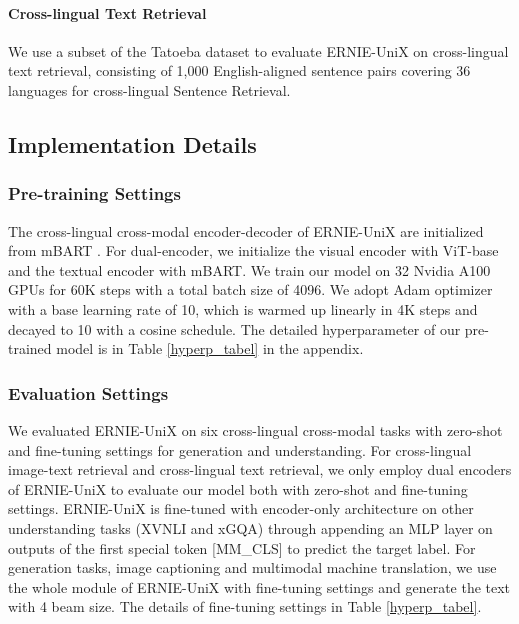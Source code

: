 \documentclass{article}
\begin{document}
\paragraph{Cross-lingual Text Retrieval}
We use a subset of the Tatoeba \cite{tatoeba} dataset to evaluate ERNIE-UniX on cross-lingual text retrieval, consisting of 1,000 English-aligned sentence pairs covering 36 languages for cross-lingual Sentence Retrieval.
\subsection{Implementation Details}
\subsubsection{Pre-training Settings}
The cross-lingual cross-modal encoder-decoder of ERNIE-UniX are initialized from mBART \cite{mbart}. For dual-encoder, we initialize the visual encoder with ViT-base \cite{vit2020} and the textual encoder with mBART. We train our model on 32 Nvidia A100 GPUs for 60K steps with a total batch size of 4096. We adopt Adam optimizer \cite{adamw} with a base learning rate of 10, which is warmed up linearly in 4K steps and decayed to 10 with a cosine schedule. The detailed hyperparameter of our pre-trained model is in Table \ref{hyperp_tabel} in the appendix.
\subsubsection{Evaluation Settings}
We evaluated  ERNIE-UniX on six cross-lingual cross-modal tasks with zero-shot and fine-tuning settings for generation and understanding. For cross-lingual image-text retrieval and cross-lingual text retrieval, we only employ dual encoders of ERNIE-UniX to evaluate our model both with zero-shot and fine-tuning settings. ERNIE-UniX is fine-tuned with encoder-only architecture on other understanding tasks (XVNLI and xGQA) through appending an MLP layer on outputs of the first special token [MM\_CLS] to predict the target label. For generation tasks, image captioning and multimodal machine translation, we use the whole module of ERNIE-UniX with fine-tuning settings and generate the text with 4 beam size. The details of fine-tuning settings in 
Table \ref{hyperp_tabel}.
\end{document}
